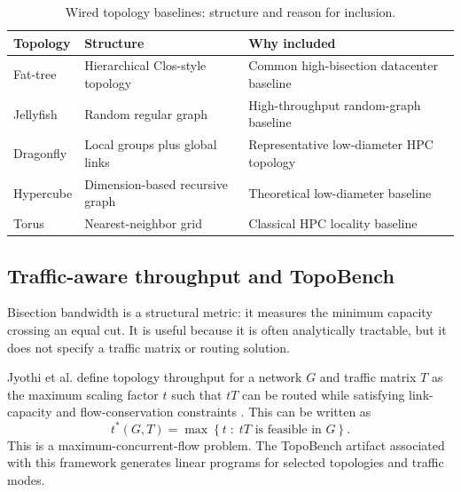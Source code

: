 \documentclass[conference]{IEEEtran}
\begin{document}
\begin{table}[!t]
\centering
\caption{Wired topology baselines: structure and reason for inclusion.}
\scriptsize
\begin{tabular}{p{}p{}p{}}
\toprule
Topology & Structure & Why included \\
\midrule
Fat-tree & Hierarchical Clos-style topology & Common high-bisection datacenter baseline \\
Jellyfish & Random regular graph & High-throughput random-graph baseline \\
Dragonfly & Local groups plus global links & Representative low-diameter HPC topology \\
Hypercube & Dimension-based recursive graph & Theoretical low-diameter baseline \\
Torus & Nearest-neighbor grid & Classical HPC locality baseline \\
\bottomrule
\end{tabular}
\end{table}

\subsection{Traffic-aware throughput and TopoBench}

Bisection bandwidth is a structural metric: it measures the minimum capacity crossing an equal cut. It is useful because it is often analytically tractable, but it does not specify a traffic matrix or routing solution.

Jyothi et al. define topology throughput for a network \(G\) and traffic matrix \(T\) as the maximum scaling factor \(t\) such that \(tT\) can be routed while satisfying link-capacity and flow-conservation constraints \cite{jyothi2016}. This can be written as
\begin{equation}
t^*(G,T) = \max \left\{ t \;:\; tT \text{ is feasible in } G \right\}.
\end{equation}
This is a maximum-concurrent-flow problem. The TopoBench artifact associated with this framework generates linear programs for selected topologies and traffic modes.
\end{document}
